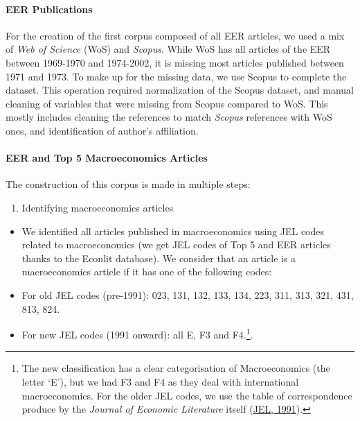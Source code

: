 \documentclass[
  12pt,
  onecolumn]{article}
\providecommand{\tightlist}{%
  \setlength{\itemsep}{0pt}\setlength{\parskip}{0pt}}
\begin{document}
\hypertarget{eer-publications}{%
\paragraph*{EER Publications}\label{eer-publications}}

For the creation of the first corpus composed of all EER articles, we used a mix of \emph{Web of Science} (WoS) and \emph{Scopus}. While WoS has all articles of the EER between 1969-1970 and 1974-2002, it is missing most articles published between 1971 and 1973. To make up for the missing data, we use Scopus to complete the dataset. This operation required normalization of the Scopus dataset, and manual cleaning of variables that were missing from Scopus compared to WoS. This mostly includes cleaning the references to match \emph{Scopus} references with WoS ones, and identification of author's affiliation.

\hypertarget{eer-top5-macro}{%
\paragraph*{EER and Top 5 Macroeconomics Articles}\label{eer-top5-macro}}

The construction of this corpus is made in multiple steps:

\begin{enumerate}
\def\labelenumi{\arabic{enumi}.}
\tightlist
\item
  Identifying macroeconomics articles
\end{enumerate}

\begin{itemize}
\item
  We identified all articles published in macroeconomics using JEL codes related to macroeconomics (we get JEL codes of Top 5 and EER articles thanks to the Econlit database). We consider that an article is a macroeconomics article if it has one of the following codes:
\item
  For old JEL codes (pre-1991): 023, 131, 132, 133, 134, 223, 311, 313, 321, 431, 813, 824.
\item
  For new JEL codes (1991 onward): all E, F3 and F4.\footnote{The new classification has a clear categorisation of Macroeconomics (the letter `E'), but we had F3 and F4 as they deal with international macroeconomics. For the older JEL codes, we use the table of correspondence produce by the \emph{Journal of Economic Literature} itself (\protect\hyperlink{ref-jel1991}{JEL, 1991}).}.
\end{itemize}
\end{document}
